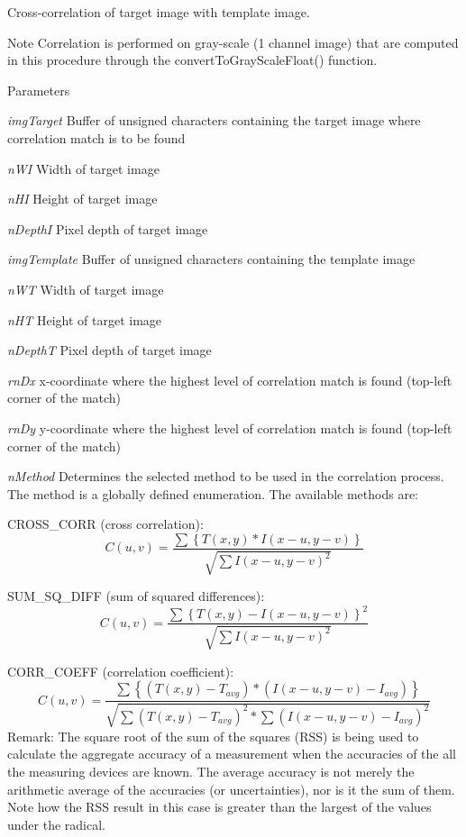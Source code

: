 Cross-\/correlation of target image with template image. \begin{DoxyNote}{Note}
Correlation is performed on gray-\/scale (1 channel image) that are computed in this procedure through the convertToGrayScaleFloat() function. 
\end{DoxyNote}

\begin{DoxyParams}{Parameters}
\item[{\em imgTarget}]Buffer of unsigned characters containing the target image where correlation match is to be found \item[{\em nWI}]Width of target image \item[{\em nHI}]Height of target image \item[{\em nDepthI}]Pixel depth of target image \item[{\em imgTemplate}]Buffer of unsigned characters containing the template image \item[{\em nWT}]Width of target image \item[{\em nHT}]Height of target image \item[{\em nDepthT}]Pixel depth of target image \item[{\em rnDx}]x-\/coordinate where the highest level of correlation match is found (top-\/left corner of the match) \item[{\em rnDy}]y-\/coordinate where the highest level of correlation match is found (top-\/left corner of the match) \item[{\em nMethod}]Determines the selected method to be used in the correlation process. The method is a globally defined enumeration. The available methods are:
\begin{DoxyItemize}
\item CROSS\_\-CORR (cross correlation): \[ C(u,v) = \frac {\sum{\left\{T(x,y) * I(x-u,y-v)\right\}}} {\sqrt{ \sum{I(x-u,y-v)^2}}} \]
\item SUM\_\-SQ\_\-DIFF (sum of squared differences): \[ C(u,v) = \frac {\sum{\left\{T(x,y)-I(x-u,y-v)\right\}^2}} {\sqrt{\sum{I(x-u,y-v)^2}}} \]
\item CORR\_\-COEFF (correlation coefficient): \[ C(u,v) = \frac {\sum{\left\{(T(x,y)-T_{avg}) * (I(x-u,y-v)-I_{avg})\right\}}} {\sqrt{\sum{(T(x,y)-T_{avg})^2} * \sum{(I(x-u,y-v)-I_{avg})^2}}} \] Remark: The square root of the sum of the squares (RSS) is being used to calculate the aggregate accuracy of a measurement when the accuracies of the all the measuring devices are known. The average accuracy is not merely the arithmetic average of the accuracies (or uncertainties), nor is it the sum of them. Note how the RSS result in this case is greater than the largest of the values under the radical. 

\end{DoxyItemize}
\end{DoxyParams}
